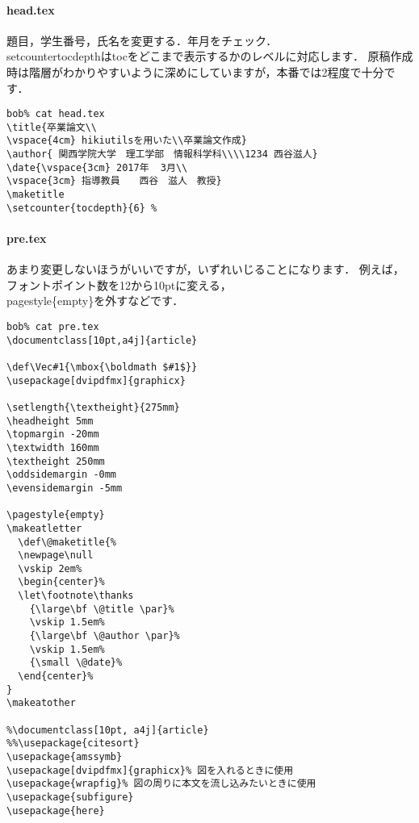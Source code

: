 \paragraph{head.tex}
題目，学生番号，氏名を変更する．年月をチェック．
\\setcounter{tocdepth}はtocをどこまで表示するかのレベルに対応します．
原稿作成時は階層がわかりやすいように深めにしていますが，本番では2程度で十分です．
\begin{lstlisting}[style=customTeX]
bob% cat head.tex
\title{卒業論文\\
\vspace{4cm} hikiutilsを用いた\\卒業論文作成}
\author{ 関西学院大学　理工学部　情報科学科\\\\1234 西谷滋人}
\date{\vspace{3cm} 2017年  3月\\
\vspace{3cm} 指導教員　　西谷　滋人　教授}
\maketitle
\setcounter{tocdepth}{6} %

\end{lstlisting}
\paragraph{pre.tex}
あまり変更しないほうがいいですが，いずれいじることになります．
例えば，フォントポイント数を12から10ptに変える，\\pagestyle\{empty\}を外すなどです．
\begin{lstlisting}[style=customTeX]
bob% cat pre.tex
\documentclass[10pt,a4j]{article}

\def\Vec#1{\mbox{\boldmath $#1$}}
\usepackage[dvipdfmx]{graphicx}

\setlength{\textheight}{275mm}
\headheight 5mm
\topmargin -20mm
\textwidth 160mm
\textheight 250mm
\oddsidemargin -0mm
\evensidemargin -5mm

\pagestyle{empty}
\makeatletter
  \def\@maketitle{%
  \newpage\null
  \vskip 2em%
  \begin{center}%
  \let\footnote\thanks
    {\large\bf \@title \par}%
    \vskip 1.5em%
    {\large\bf \@author \par}%
    \vskip 1.5em%
    {\small \@date}%
  \end{center}%
}
\makeatother

%\documentclass[10pt, a4j]{article}
%%\usepackage{citesort}
\usepackage{amssymb}
\usepackage[dvipdfmx]{graphicx}% 図を入れるときに使用
\usepackage{wrapfig}% 図の周りに本文を流し込みたいときに使用
\usepackage{subfigure}
\usepackage{here}
\end{lstlisting}
